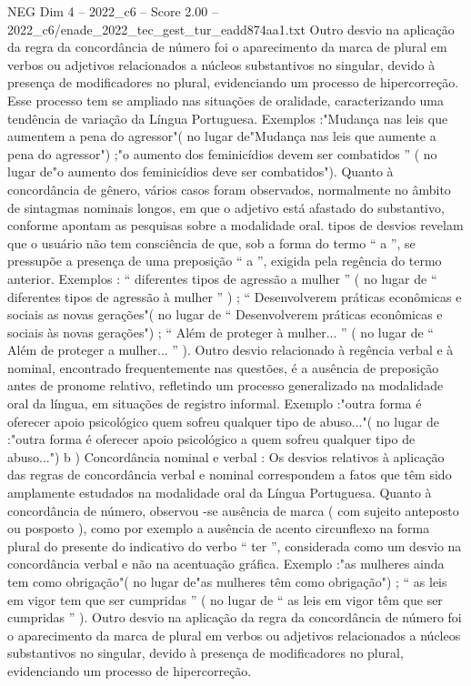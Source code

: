 \begin{textsample}{NEG Dim 4 – 2022\_c6 – Score 2.00 – 2022\_c6/enade\_2022\_tec\_gest\_tur\_eadd874aa1.txt}
Outro desvio na aplicação da regra da concordância de número foi o aparecimento da marca de plural em verbos ou adjetivos relacionados a núcleos substantivos no singular, devido à presença de modificadores no plural, evidenciando um processo de hipercorreção.
Esse processo tem se ampliado nas situações de oralidade, caracterizando uma tendência de variação da Língua Portuguesa.
Exemplos :"Mudança nas leis que aumentem a pena do agressor"( no lugar de"Mudança nas leis que aumente a pena do agressor") ;"o aumento dos feminicídios devem ser combatidos ” ( no lugar de"o aumento dos feminicídios deve ser combatidos").
Quanto à concordância de gênero, vários casos foram observados, normalmente no âmbito de sintagmas nominais longos, em que o adjetivo está afastado do substantivo, conforme apontam as pesquisas sobre a modalidade oral. tipos de desvios revelam que o usuário não tem consciência de que, sob a forma do termo “ a ”, se pressupõe a presença de uma preposição “ a ”, exigida pela regência do termo anterior.
Exemplos : “ diferentes tipos de agressão a mulher ” ( no lugar de “ diferentes tipos de agressão à mulher ” ) ; “ Desenvolverem práticas econômicas e sociais as novas gerações"( no lugar de “ Desenvolverem práticas econômicas e sociais às novas gerações") ; “ Além de proteger à mulher... ” ( no lugar de “ Além de proteger a mulher... ” ).
Outro desvio relacionado à regência verbal e à nominal, encontrado frequentemente nas questões, é a ausência de preposição antes de pronome relativo, refletindo um processo generalizado na modalidade oral da língua, em situações de registro informal.
Exemplo :"outra forma é oferecer apoio psicológico quem sofreu qualquer tipo de abuso..."( no lugar de :"outra forma é oferecer apoio psicológico a quem sofreu qualquer tipo de abuso...") b ) Concordância nominal e verbal : Os desvios relativos à aplicação das regras de concordância verbal e nominal correspondem a fatos que têm sido amplamente estudados na modalidade oral da Língua Portuguesa.
Quanto à concordância de número, observou -se ausência de marca ( com sujeito anteposto ou posposto ), como por exemplo a ausência de acento circunflexo na forma plural do presente do indicativo do verbo “ ter ”, considerada como um desvio na concordância verbal e não na acentuação gráfica.
Exemplo :"as mulheres ainda tem como obrigação"( no lugar de"as mulheres têm como obrigação") ; “ as leis em vigor tem que ser cumpridas ” ( no lugar de “ as leis em vigor têm que ser cumpridas ” ).
Outro desvio na aplicação da regra da concordância de número foi o aparecimento da marca de plural em verbos ou adjetivos relacionados a núcleos substantivos no singular, devido à presença de modificadores no plural, evidenciando um processo de hipercorreção.

\end{textsample}
